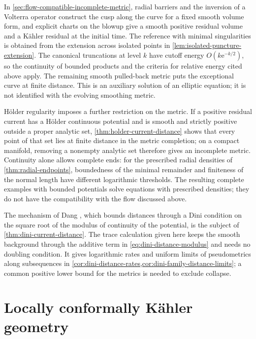In \cref{sec:flow-compatible-incomplete-metric}, radial barriers and the inversion of a Volterra operator construct the cusp along the curve for a fixed smooth volume form, and explicit charts on the blowup give a smooth positive residual volume and a K\"ahler residual at the initial time. The reference with minimal singularities is obtained from the extension across isolated points in \cref{lem:isolated-puncture-extension}. The canonical truncations at level $k$ have cutoff energy $O(k\mathrm{e}^{-k/2})$, so the continuity of bounded products and the criteria for relative energy cited above apply. The remaining smooth pulled-back metric puts the exceptional curve at finite distance. This is an auxiliary solution of an elliptic equation; it is not identified with the evolving smoothing metric.

H\"older regularity imposes a further restriction on the metric. If a positive residual current has a H\"older continuous potential and is smooth and strictly positive outside a proper analytic set, \cref{thm:holder-current-distance} shows that every point of that set lies at finite distance in the metric completion; on a compact manifold, removing a nonempty analytic set therefore gives an incomplete metric. Continuity alone allows complete ends: for the prescribed radial densities of \cref{thm:radial-endpoints}, boundedness of the minimal remainder and finiteness of the normal length have different logarithmic thresholds. The resulting complete examples with bounded potentials solve equations with prescribed densities; they do not have the compatibility with the flow discussed above.

The mechanism of Dang \cite[v2, Proposition~5.2, pp.~16--17]{Dang26}, which bounds distances through a Dini condition on the square root of the modulus of continuity of the potential, is the subject of \cref{thm:dini-current-distance}. The trace calculation given here keeps the smooth background through the additive term in \eqref{eq:dini-distance-modulus} and needs no doubling condition. It gives logarithmic rates and uniform limits of pseudometrics along subsequences in \cref{cor:dini-distance-rates,cor:dini-family-distance-limits}; a common positive lower bound for the metrics is needed to exclude collapse.

\section{Locally conformally K\"ahler geometry}
\label{sec:history-lck}

